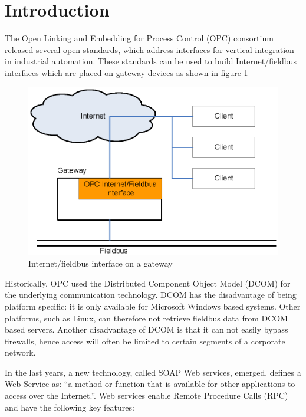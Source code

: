 
\section {Introduction}

The Open Linking and Embedding for Process Control (OPC) consortium
released several open standards, which address interfaces for vertical
integration in industrial automation. These standards can be used to
build Internet/fieldbus interfaces which are placed on gateway devices
as shown in figure \ref{inet_fb_gw}

\begin{figure}[ht]
\centering
\includegraphics[scale=0.7]{graphics/inet_fb_gw.eps}
\caption{Internet/fieldbus interface on a gateway}
\label {inet_fb_gw} 
\end{figure} 

Historically, OPC used the Distributed Component Object Model (DCOM)
for the underlying communication technology. DCOM has the disadvantage
of being platform specific: it is only available for Microsoft
Windows based systems. Other platforms, such as Linux, can therefore
not retrieve fieldbus data from DCOM based servers. Another
disadvantage of DCOM is that it can not easily bypass firewalls, hence
access will often be limited to certain segments of a corporate
network.

In the last years, a new technology, called SOAP Web services, emerged.
\cite{SOAP2} defines a Web Service as: ``a method or function that is
available for other applications to access over the Internet.''. Web
services enable Remote Procedure Calls (RPC) and have the following
key features:


